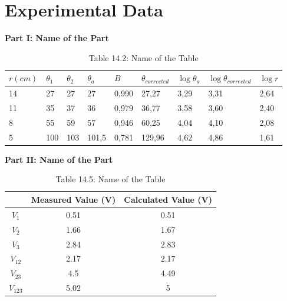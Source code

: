 \section{Experimental Data}

\textbf{Part I: Name of the Part}

\begin{table}[h]
    \centering
    \captionsetup{labelformat=empty}
    \caption{Table 14.2: Name of the Table}
    \begin{tabular}{|l|l|l|l|l|l|l|l|l|}
    \hline
        $r(cm)$ & $\theta_1$ & $\theta_2$ & $\theta_a$ & $B$ & $\theta_{corrected}$ & $\log{\theta_a}$ & $\log{\theta_{corrected}}$ & $\log{r}$ \\ \hline
        14 & 27 & 27 & 27 & 0,990 & 27,27 & 3,29 & 3,31 & 2,64 \\ \hline
        11 & 35 & 37 & 36 & 0,979 & 36,77 & 3,58 & 3,60 & 2,40 \\ \hline
        8 & 55 & 59 & 57 & 0,946 & 60,25 & 4,04 & 4,10 & 2,08 \\ \hline
        5 & 100 & 103 & 101,5 & 0,781 & 129,96 & 4,62 & 4,86 & 1,61 \\ \hline
    \end{tabular}
\end{table}


\textbf{Part II: Name of the Part}

\begin{table}[h]
    \centering
    \captionsetup{labelformat=empty}
    \caption{Table 14.5: Name of the Table}
    \begin{tabular}{|c|c|c|}
        \hline
        & Measured Value (\si{\volt}) & Calculated Value (\si{\volt}) \\
        \hline
        $V_1$ & 0.51 & 0.51 \\
        \hline
        $V_2$ & 1.66 & 1.67 \\
        \hline
        $V_3$ & 2.84 & 2.83 \\
        \hline
        $V_{12}$ & 2.17 & 2.17 \\
        \hline
        $V_{23}$ & 4.5 & 4.49 \\
        \hline
        $V_{123}$ & 5.02 & 5 \\
        \hline
    \end{tabular}
\end{table}


